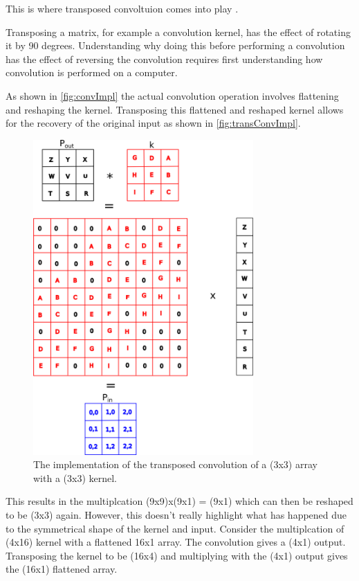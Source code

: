 This is where transposed convoltuion comes into play \cite{zeiler2010deconvolutional}. 

Transposing a matrix, for example a convolution kernel, has the effect of rotating it by 90 degrees. Understanding why doing this before performing a convolution has the effect of reversing the convolution requires first understanding how convolution is performed on a computer.

As shown in \autoref{fig:convImpl} the actual convolution operation involves flattening and reshaping the kernel. Transposing this flattened and reshaped kernel allows for the recovery of the original input as shown in \autoref{fig:transConvImpl}. 

\begin{figure}
	\centering	\includegraphics[width=0.75\textwidth]{Figs/intro2dl/TransconvolutionImplementation.png}
	\caption{The implementation of the transposed convolution of a (3x3) array with a (3x3) kernel.}
	\label{fig:transConvImpl}
\end{figure}

This results in the multiplcation (9x9)x(9x1) = (9x1) which can then be reshaped to be (3x3) again. However, this doesn't really highlight what has happened due to the symmetrical shape of the kernel and input. Consider the multiplcation of (4x16) kernel with a flattened 16x1 array. The convolution gives a (4x1) output. Transposing the kernel to be (16x4) and multiplying with the (4x1) output gives the (16x1) flattened array. 


